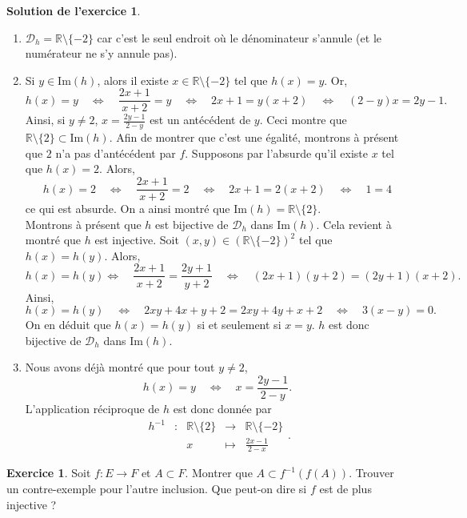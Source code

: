 \documentclass[a4paper, 11pt,openany]{article}%
\theoremstyle{plain}
\theoremstyle{definition}
\newtheorem{exo}{Exercice}
\newtheorem{sol}{Solution de l'exercice}
\theoremstyle{remark}
\newcommand{\R}{\mathbb{R}}
\newcommand{\calD}{\mathcal{D}}
\newcommand{\im}{\text{Im}}
\begin{document}
\begin{sol}
\begin{enumerate}
\item $\calD_h = \R \setminus \{-2\}$ car c'est le seul endroit où le dénominateur s'annule (et le numérateur ne s'y annule pas).
\item Si $y \in \im(h)$, alors il existe $x \in \R \setminus \{-2\}$ tel que $h(x) = y$. Or,
\[h(x) = y \quad \Leftrightarrow \quad \frac{2x+1}{x+2} = y \quad \Leftrightarrow \quad 2x+1 = y(x+2) \quad \Leftrightarrow \quad (2-y)x = 2y-1.\]
Ainsi, si $y \neq 2$, $x = \frac{2y-1}{2-y}$ est un antécédent de $y$. Ceci montre que $\R \setminus \{2\} \subset \im(h)$. Afin de montrer que c'est une égalité, montrons à présent que $2$ n'a pas d'antécédent par $f$. Supposons par l'absurde qu'il existe $x$ tel que $h(x) = 2$. Alors,
\[ h(x) = 2 \quad \Leftrightarrow \quad \frac{2x+1}{x+2} =2 \quad \Leftrightarrow \quad 2x+1 = 2(x+2) \quad \Leftrightarrow \quad 1 = 4\]
ce qui est absurde. On a ainsi montré que $\im(h) = \R \setminus \{2\}$.\\
Montrons à présent que $h$ est bijective de $\calD_h$ dans $\im(h)$. Cela revient à montré que $h$ est injective. Soit $(x,y) \in (\R \setminus \{-2\})^2$ tel que $h(x) = h(y)$. Alors,
\[h(x) = h(y) \Leftrightarrow \quad \frac{2x+1}{x+2} = \frac{2y+1}{y+2} \quad \Leftrightarrow \quad (2x+1)(y+2) = (2y+1)(x+2).\]
Ainsi,
\[ h(x) = h(y) \quad \Leftrightarrow \quad 2xy + 4x + y + 2 = 2xy + 4y + x + 2 \quad \Leftrightarrow \quad   3(x-y)  = 0 .\]
On en déduit que $h(x) = h(y)$ si et seulement si $x =y$. $h$ est donc bijective de $\calD_h$ dans $\im(h)$.
\item Nous avons déjà montré que pour tout $y \neq 2$,
\[h(x) = y \quad \Leftrightarrow \quad x = \frac{2y-1}{2-y}.\]
L'application réciproque de $h$ est donc donnée par
\[  \begin{array}{ccccc}
h^{-1} & : & \R \setminus \{2\} & \to & \R \setminus \{-2\} \\
 & & x & \mapsto & \frac{2x-1}{2-x}
\end{array}.\]
\end{enumerate}
\end{sol}

\begin{exo}
Soit $f :E \to F$ et $A \subset F$. Montrer que $ A \subset f^{-1}(f(A))$. Trouver un contre-exemple pour l'autre inclusion. Que peut-on dire si $f$ est de plus injective ?
\end{exo}
\end{document}
